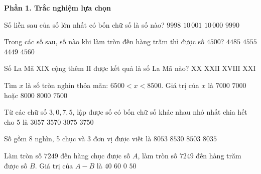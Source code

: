 \textbf{Phần 1. Trắc nghiệm lựa chọn}

\begin{ex} %
Số liền sau của số lớn nhất có bốn chữ số là số nào?
\choice
{$9998$}
{$10\,001$}
{\True $10\,000$}
{$9990$}
\end{ex}

\begin{ex} %
Trong các số sau, số nào khi làm tròn đến hàng trăm thì được số $4500$?
\choice
{\True $4485$}
{$4555$}
{$4449$}
{$4560$}
\end{ex}

\begin{ex} %
Số La Mã $\text{XIX}$ cộng thêm $\text{II}$ được kết quả là số La Mã nào?
\choice
{$\text{XX}$}
{$\text{XXII}$}
{$\text{XVIII}$}
{\True $\text{XXI}$}
\end{ex}

\begin{ex} %
Tìm $x$ là số tròn nghìn thỏa mãn: $6500 < x < 8500$. Giá trị của $x$ là
\choice
{$7000$}
{\True $7000$ hoặc $8000$}
{$8000$}
{$7500$}
\end{ex}

\begin{ex} %
Từ các chữ số $3, 0, 7, 5$, lập được số có bốn chữ số khác nhau nhỏ nhất chia hết cho 5 là
\choice
{$3057$}
{$3570$}
{\True $3075$}
{$3750$}
\end{ex}

\begin{ex} %
Số gồm 8 nghìn, 5 chục và 3 đơn vị được viết là
\choice
{\True $8053$}
{$8530$}
{$8503$}
{$8035$}
\end{ex}

\begin{ex} %
Làm tròn số $7249$ đến hàng chục được số $A$, làm tròn số $7249$ đến hàng trăm được số $B$. Giá trị của $A - B$ là
\choice
{$40$}
{$60$}
{$0$}
{\True $50$}
\end{ex}

